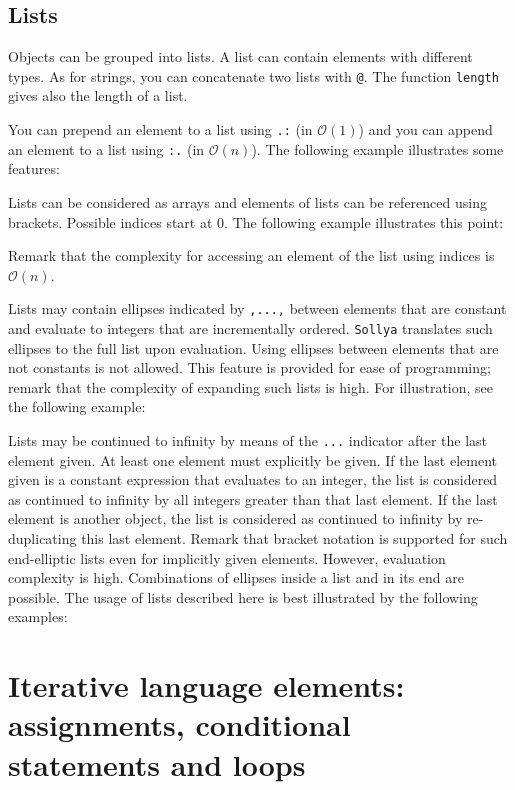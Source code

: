 \documentclass[a4paper]{article}
\newcommand{\com}[1]{\texttt{#1}}
\newcommand{\sollya}{\texttt{Sollya}\xspace}
\begin{document}
\subsection{Lists}
Objects can be grouped into lists. A list can contain elements with different types. As for strings, you can concatenate two lists with \com{@}. The function \com{length} gives also the length of a list.

You can prepend an element to a list using \com{.:} (in $\mathcal{O}(1)$) and you can append an element to a list using \com{:.} (in $\mathcal{O}(n)$). The following example illustrates some features:



Lists can be considered as arrays and elements of lists can be
referenced using brackets. Possible indices start at $0$. The
following example illustrates this point:



Remark that the complexity for accessing an element of the list using
indices is $\mathcal{O}(n)$.

Lists may contain ellipses indicated by \texttt{,...,} between
elements that are constant and evaluate to integers that are
incrementally ordered. \sollya translates such ellipses to the full
list upon evaluation. Using ellipses between elements that are not
constants is not allowed. This feature is provided for ease of
programming; remark that the complexity of expanding such lists is
high. For illustration, see the following example:



Lists may be continued to infinity by means of the \texttt{...}
indicator after the last element given. At least one element must
explicitly be given. If the last element given is a constant
expression that evaluates to an integer, the list is considered as
continued to infinity by all integers greater than that last
element. If the last element is another object, the list is considered
as continued to infinity by re-duplicating this last element. Remark
that bracket notation is supported for such end-elliptic lists even
for implicitly given elements. However, evaluation complexity is
high. Combinations of ellipses inside a list and in its end are
possible. The usage of lists described here is best illustrated by the
following examples:



\section{Iterative language elements: assignments, conditional statements and loops}
\end{document}

